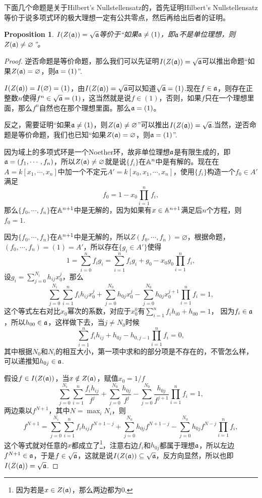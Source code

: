 \documentclass[9pt]{extarticle}
\theoremstyle{plain}%
\newtheorem{pro}[defi]{Proposition}%
\begin{document}
下面几个命题是关于Hilbert's Nullstellensatz的，首先证明Hilbert's Nullstellensatz等价于说多项式环的极大理想一定有公共零点，然后再给出后者的证明。
\begin{pro}
\label{p1.10}
$I(Z(\mathfrak{a}))=\sqrt{\mathfrak{a}}$等价于“如果$\mathfrak{a}\neq(1)$，即$\mathfrak{a}$不是单位理想，则$Z(\mathfrak{a})\neq\varnothing$”。
\end{pro}
\begin{proof}
	逆否命题是等价命题，那么我们可以先证明$I(Z(\mathfrak{a}))=\sqrt{\mathfrak{a}}$可以推出命题“如果$Z(\mathfrak{a})=\varnothing$，则$\mathfrak{a}=(1)$”.

	$I(Z(\mathfrak{a}))=I(\varnothing)=(1)$，由$I(Z(\mathfrak{a}))=\sqrt{\mathfrak{a}}$可以知道$\sqrt{\mathfrak{a}}=(1)$.现在$f\in \mathfrak{a}$，则存在正整数$n$使得$f^n\in \sqrt{\mathfrak{a}}=(1)$，这当然就是说$f\in (1)$，否则，如果$f$只在一个理想里面，那么$f^n$自然也在那个理想里面。那么$\mathfrak{a}=(1)$。

	反之，需要证明“如果$\mathfrak{a}\neq(1)$，则$Z(\mathfrak{a})\neq\varnothing$”可以推出$I(Z(\mathfrak{a}))=\sqrt{\mathfrak{a}}$.当然，逆否命题是等价命题，我们也已知“如果$Z(\mathfrak{a})=\varnothing$，则$\mathfrak{a}=(1)$”.

	因为域上的多项式环是一个Noether环，故非单位理想$\mathfrak{a}$是有限生成的，即$\mathfrak{a}=(f_1,\cdots,f_n)$，所以$Z(\mathfrak{a})\neq \varnothing$就是说$\{f_i\}$在$\mathbb{A}^n$中是有解的。现在在$A=k[x_1,\cdots,x_n]$中加一个不定元$A'=k[x_0,x_1,\cdots,x_n]$，使用$\{f_i\}$构造一个$f_{0}\in A'$满足
	\[
		f_{0}=1-x_{0}\prod_{i=1}^nf_i,
	\]
	那么$\{f_0,\cdots,f_n\}$在$\mathbb{A}^{n+1}$中是无解的，因为如果有$x\in \mathbb{A}^{n+1}$满足后$n$个方程，则$f_{0}=1$.

	因为$\{f_0,\cdots,f_n\}$在$\mathbb{A}^{n+1}$中是无解的，所以$Z(f_0,\cdots,f_n)=\varnothing$，根据命题，$(f_0,\cdots,f_n)=(1)=A'$，所以存在$\{g_i\in A'\}$使得
	\[
		1=\sum_{i=0}^{n} f_ig_i=\sum_{i=1}^{n} f_ig_i+g_{0}-x_{0}g_{0}\prod_{i=1}^nf_i,
	\]
	设$g_i=\sum_{j=0}^{N_i}h_{ij}x_{0}^j$，那么
	\[
		\sum_{j=0}^{N_i}\sum_{i=1}^{n}f_ih_{ij}x_{0}^j+\sum_{j=0}^{N_{0}}h_{0j}x_{0}^j-\sum_{j=0}^{N_{0}}h_{0j}x_{0}^{j+1}\prod_{i=1}^nf_i=1,
	\]
	这个等式左右对比$x_0$幂次的系数，对应于$x_0^0$有$\sum_{i=1}^{n}f_ih_{i0}+h_{00}=1$，
	因为$f_i\in \mathfrak{a}$，所以$h_{00}\in \mathfrak{a}$，这样做下去，当$j\neq N_0$时候
	\[
		\sum_{i=1}^{n}f_ih_{ij}+h_{0j}-h_{0,j-1}\prod_{i=1}^nf_i=0,
	\]
	其中根据$N_0$和$N_i$的相互大小，第一项中求和的部分项是不存在的，不管怎么样，可以递推知$h_{0j}\in \mathfrak{a}$.

	假设$f\in I(Z(\mathfrak{a}))$，当$x\notin Z(\mathfrak{a})$，赋值$x_0=1/f$
	\[
		\sum_{j=0}^{N_i}\sum_{i=1}^{n}\frac{f_ih_{ij}}{f^j}+\sum_{j=0}^{N_{0}}\frac{h_{0j}}{f^j}-\sum_{j=0}^{N_{0}}\frac{h_{0j}}{f^{j+1}}\prod_{i=1}^nf_i=1,
	\]
	两边乘以$f^{N+1}$，其中$N=\max_iN_i$，则
	\[
		f^{N+1}=\sum_{j=0}^{N_i}\sum_{i=1}^{n}f_ih_{ij}f^{N+1-j}+\sum_{j=0}^{N_{0}}h_{0j}f^{N+1-j}-\sum_{j=0}^{N_{0}}h_{0j}f^{N-j}\prod_{i=1}^nf_i,
	\]
	这个等式就对任意的$x$都成立了\footnote{因为若是$x\in Z(\mathfrak{a})$，那么两边都为$0$.}，注意右边$f_i$和$h_{0j}$都属于理想$\mathfrak{a}$，所以左边$f^{N+1}\in \mathfrak{a}$，于是$f\in \sqrt{\mathfrak{a}}$，这就是说$I(Z(\mathfrak{a}))\subseteq \sqrt{\mathfrak{a}}$，反方向显然，所以也即$I(Z(\mathfrak{a}))=\sqrt{\mathfrak{a}}$.
\end{proof}
	
\end{document}
